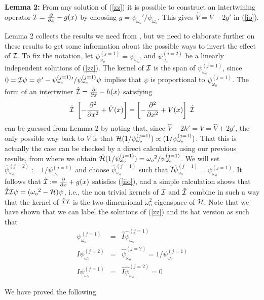\documentclass[aps,floats,showpacs,amssymb,tightenlines]{revtex4}
\def\w{\omega}
\def\p{\partial}
\def\I{{\cal I}}
\def\po{\psi_{\w_o}}
\def\pe{\psi_{\w_o}^{(j=1)}{}}
\begin{document}
\vspace{.3cm}

\noindent
{\bf Lemma 2:} From any solution of (\ref{zz}) it is possible to construct an intertwining operator
 $\I= \frac{\p}{\p x} -g(x)$  by choosing
$g = \po' / \po$. This gives  $\hat V = V - 2 g'$ in (\ref{io}).

\vspace{.3cm}

Lemma 2 collects the results we  need from \cite{price},
but  we need to elaborate further on these results to get some information  about
the possible ways to invert the effect of $\I$.  To fix the notation, let  $\psi_{\w_o}^{(j=1)}=\po$, and
$\psi_{\w_o}^{(j=2)}$ be a  linearly independent solutions of (\ref{zz}). The
kernel of $\I$ is the span of $\pe$, since   $0 = \I \psi = \psi' - \pe '
/ \pe \psi$ implies that $\psi$ is proportional to $\pe$. The form
of an intertwiner $\hat \I = \frac{\p}{\p x} -h(x)$
satisfying
\begin{equation} \label{iio}
\hat \I \; \left[ - \frac{\p^2 }{\p x^2} + \hat  V(x) \right]  =
\left[ - \frac{\p^2 }{\p x^2} +  V(x) \right] \; \hat \I
\end{equation}
can be guessed from Lemma 2 by noting that, since $\hat V - 2h' = V =
\hat V + 2g'$, the only possible way back to $V$ is that
${\cal H} (1 / \pe) \propto (1 / \pe)$. That this is actually the
case can be checked by a direct calculation
 using our previous results, from where we obtain
  $\hat {\cal H}  (1/ \pe) = \w_o{}^ 2 /\pe$. We will set $\hat \psi {}_{\w_o}^{(j=2)} := 1/\pe$ and
  choose $\hat \psi {}_{\w_o}^{(j=1)}$ such that $\hat I \hat \psi {}_{\w_o}^{(j=1)} = \pe$.
  It follows that $\hat \I := \frac{\p}{\p x} + g(x)$ satisfies (\ref{iio}), and a simple calculation shows that
$\hat \I \I \psi = (\w_o{}^2 - {\cal H}) \psi$, i.e., the non trivial kernels of $\I$ and $\hat \I$ combine
in such a way that the kernel of $\hat \I \I$ is the two dimensional $\w_o^2$ eigenspace of ${\cal H}$. Note that we have
shown that we can label the solutions of (\ref{zz}) and its hat version as
 such that
\begin{eqnarray} \nonumber
\pe &=&  \hat I \hat \psi _{\w_o}^{(j=1)}\\ \label{qsy}
I \psi _{\w_o}^{(j=2)} &=&  \hat \psi _{\w_o}^{(j=2)} = 1 / \pe  \label{pp}\\
I \psi _{\w_o}^{(j=1)} &=& \hat I \hat \psi _{\w_o}^{(j=2)} =0\nonumber
\end{eqnarray}

We have proved the following
\vspace{.3cm}
\end{document}
